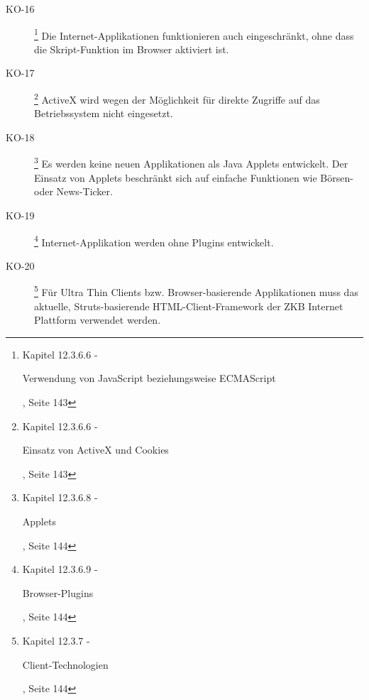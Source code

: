 \begin{description}
    \item[KO-16\label{itm:KO-16}]
    \footnote{\cite{ZkbHandbuchDerItArchitektur} Kapitel 12.3.6.6 -
    \begin{itshape}Verwendung von JavaScript beziehungsweise
    ECMAScript\end{itshape}, Seite 143}
    Die Internet-Applikationen funktionieren auch eingeschränkt, ohne dass die
    Skript-Funktion im Browser aktiviert ist.
    
    \item[KO-17\label{itm:KO-17}]
    \footnote{\cite{ZkbHandbuchDerItArchitektur} Kapitel 12.3.6.6 -
    \begin{itshape}Einsatz von ActiveX und Cookies\end{itshape}, Seite 143}
    ActiveX wird wegen der Möglichkeit für direkte Zugriffe auf das
    Betriebssystem nicht eingesetzt.
    
    \item[KO-18\label{itm:KO-18}]
    \footnote{\cite{ZkbHandbuchDerItArchitektur} Kapitel 12.3.6.8 -
    \begin{itshape}Applets\end{itshape}, Seite 144}
    Es werden keine neuen Applikationen als Java Applets entwickelt. Der
    Einsatz von Applets beschränkt sich auf einfache Funktionen wie Börsen-
    oder News-Ticker.
    
    \item[KO-19\label{itm:KO-19}]
    \footnote{\cite{ZkbHandbuchDerItArchitektur} Kapitel 12.3.6.9 -
    \begin{itshape}Browser-Plugins\end{itshape}, Seite 144}
    Internet-Applikation werden ohne Plugins entwickelt.
    
    \item[KO-20\label{itm:KO-20}]
    \footnote{\cite{ZkbHandbuchDerItArchitektur} Kapitel 12.3.7 -
    \begin{itshape}Client-Technologien\end{itshape}, Seite 144}
    Für Ultra Thin Clients bzw. Browser-basierende Applikationen muss das
    aktuelle, Struts-basierende HTML-Client-Framework der ZKB Internet
    Plattform verwendet werden.
    

\end{description}
